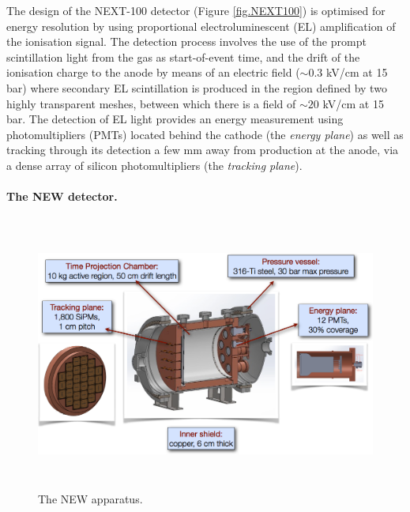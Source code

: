 The design of the NEXT-100 detector (Figure \ref{fig.NEXT100}) is optimised for energy resolution by using proportional electroluminescent (EL) amplification of the ionisation signal. The detection process involves the use of the prompt scintillation light from the gas as start-of-event time, and the drift of the ionisation charge to the anode by means of an electric field ($\sim0.3$ kV/cm at 15 bar) where secondary EL scintillation is produced in the region defined by two highly transparent meshes, between which there is a field of $\sim20$ kV/cm at 15 bar. The detection of EL light provides an energy measurement using photomultipliers (PMTs) located behind the cathode (the \emph{energy plane}) as well as tracking through its detection a few mm away from production at the anode, via a dense array of silicon photomultipliers (the \emph{tracking plane}).

\paragraph{\label{sec.new}The NEW detector.}

\begin{figure}
\centering
\includegraphics[height=9cm]{img/NEW.png}
\caption{\small The NEW apparatus.} \label{fig:NEW}
\end{figure} 

